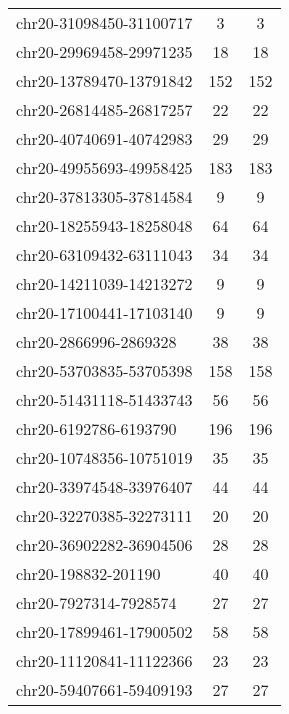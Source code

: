 \begin{longtable}{lSS}
	chr20-31098450-31100717 & 3    & 3                               \\
	chr20-29969458-29971235 & 18   & 18                              \\
	chr20-13789470-13791842 & 152  & 152                             \\
	chr20-26814485-26817257 & 22   & 22                              \\
	chr20-40740691-40742983 & 29   & 29                              \\
	chr20-49955693-49958425 & 183  & 183                             \\
	chr20-37813305-37814584 & 9    & 9                               \\
	chr20-18255943-18258048 & 64   & 64                              \\
	chr20-63109432-63111043 & 34   & 34                              \\
	chr20-14211039-14213272 & 9    & 9                               \\
	chr20-17100441-17103140 & 9    & 9                               \\
	chr20-2866996-2869328   & 38   & 38                              \\
	chr20-53703835-53705398 & 158  & 158                             \\
	chr20-51431118-51433743 & 56   & 56                              \\
	chr20-6192786-6193790   & 196  & 196                             \\
	chr20-10748356-10751019 & 35   & 35                              \\
	chr20-33974548-33976407 & 44   & 44                              \\
	chr20-32270385-32273111 & 20   & 20                              \\
	chr20-36902282-36904506 & 28   & 28                              \\
	chr20-198832-201190     & 40   & 40                              \\
	chr20-7927314-7928574   & 27   & 27                              \\
	chr20-17899461-17900502 & 58   & 58                              \\
	chr20-11120841-11122366 & 23   & 23                              \\
	chr20-59407661-59409193 & 27   & 27                              \\

\end{longtable}
